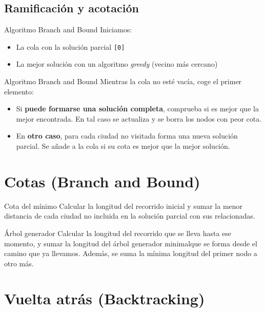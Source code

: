 \subsection{Ramificación y acotación}

\begin{frame}{Algoritmo Branch and Bound}
  Iniciamos:
  \begin{itemize}
    \item La cola con la solución parcial \texttt{[0]}
    \item La mejor solución con un algoritmo \textit{greedy} (vecino más cercano)
  \end{itemize}
\end{frame}

\begin{frame}{Algoritmo Branch and Bound}
  Mientras la cola no esté vacía, coge el primer elemento:
  \begin{itemize}
    \item Si \textbf{puede formarse una solución completa}, comprueba si es mejor que la mejor encontrada. En tal caso se actualiza y se borra los nodos con peor cota.
    \item En \textbf{otro caso}, para cada ciudad no visitada forma una nueva solución parcial. Se añade a la cola si su cota es mejor que la mejor solución.
  \end{itemize}
\end{frame}

\section{Cotas (Branch and Bound)}

\begin{frame}{Cota del mínimo}
  Calcular la longitud del recorrido inicial y sumar la menor distancia de cada ciudad no incluida en la solución parcial con sus relacionadas.
\end{frame}

\begin{frame}{Árbol generador}
  Calcular la longitud del recorrido que se lleva hasta ese momento, y sumar la longitud del árbol generador minimalque se forma desde el camino que ya llevamos. Además, se suma la mínima longitud del primer nodo a otro más.

\end{frame}

\section{Vuelta atrás (Backtracking)}


